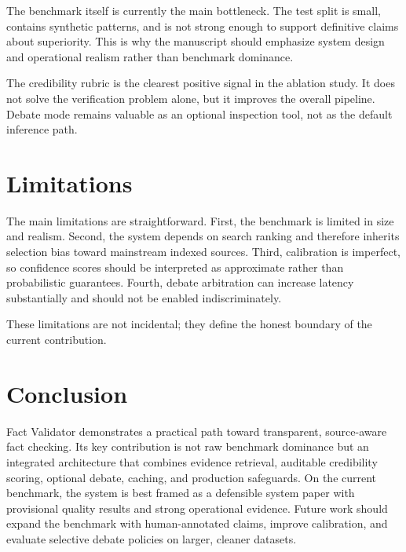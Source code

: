 \documentclass[11pt,a4paper]{article}
\begin{document}
The benchmark itself is currently the main bottleneck. The test split is small, contains synthetic patterns, and is not strong enough to support definitive claims about superiority. This is why the manuscript should emphasize system design and operational realism rather than benchmark dominance.

The credibility rubric is the clearest positive signal in the ablation study. It does not solve the verification problem alone, but it improves the overall pipeline. Debate mode remains valuable as an optional inspection tool, not as the default inference path.

\section{Limitations}

The main limitations are straightforward. First, the benchmark is limited in size and realism. Second, the system depends on search ranking and therefore inherits selection bias toward mainstream indexed sources. Third, calibration is imperfect, so confidence scores should be interpreted as approximate rather than probabilistic guarantees. Fourth, debate arbitration can increase latency substantially and should not be enabled indiscriminately.

These limitations are not incidental; they define the honest boundary of the current contribution.

\section{Conclusion}

Fact Validator demonstrates a practical path toward transparent, source-aware fact checking. Its key contribution is not raw benchmark dominance but an integrated architecture that combines evidence retrieval, auditable credibility scoring, optional debate, caching, and production safeguards. On the current benchmark, the system is best framed as a defensible system paper with provisional quality results and strong operational evidence. Future work should expand the benchmark with human-annotated claims, improve calibration, and evaluate selective debate policies on larger, cleaner datasets.
\end{document}
